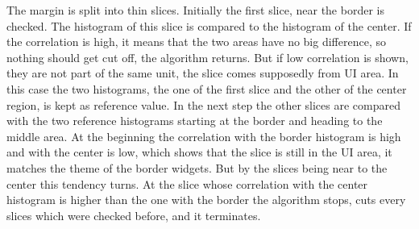 \documentclass[draft,final]{vutinfth} %
\begin{document}
The margin is split into thin slices.
Initially the first slice, near the border is checked.
The histogram of this slice is compared to the histogram of the center.
If the correlation is high, it means that the two areas have no big difference, so nothing should get cut off, the algorithm returns.
But if low correlation is shown, they are not part of the same unit, the slice comes supposedly from UI area.
In this case the two histograms, the one of the first slice and the other of the center region, is kept as reference value.
In the next step the other slices are compared with the two reference histograms starting at the border and heading to the middle area.
At the beginning the correlation with the border histogram is high and with the center is low, which shows that the slice is still in the UI area, it matches the theme of the border widgets.
But by the slices being near to the center this tendency turns.
At the slice whose correlation with the center histogram is higher than the one with the border the algorithm stops, cuts every slices which were checked before, and it terminates.\par 
\end{document}
